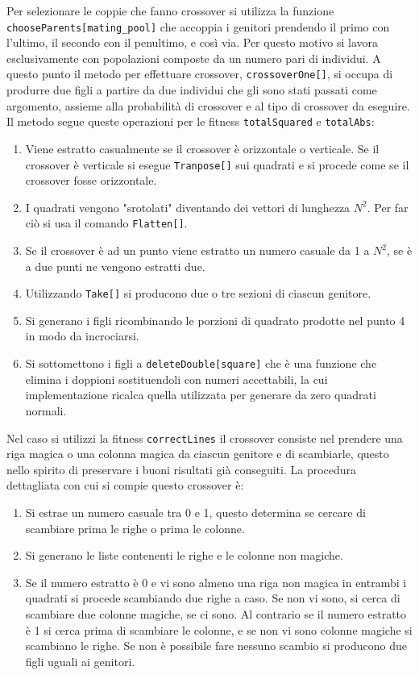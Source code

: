 \documentclass[italian,twoside,twocolumn]{article}
\begin{document}
Per selezionare le coppie che fanno crossover si utilizza la funzione \texttt{chooseParents[mating\_pool]} che accoppia i genitori prendendo il primo con l'ultimo, il secondo con il penultimo, e così via. Per questo motivo si lavora esclusivamente con popolazioni composte da un numero pari di individui. A questo punto il metodo per effettuare crossover, \texttt{crossoverOne[]}, si occupa di produrre due figli a partire da due individui che gli sono stati passati come argomento, assieme alla probabilità di crossover e al tipo di crossover da eseguire. Il metodo segue queste operazioni per le fitness \texttt{totalSquared} e \texttt{totalAbs}:
\begin{enumerate}
	\item Viene estratto casualmente se il crossover è orizzontale o verticale. Se il crossover è verticale si esegue \texttt{Tranpose[]} sui quadrati e si procede come se il crossover fosse orizzontale.
	\item I quadrati vengono "srotolati" diventando dei vettori di lunghezza $ N^2 $. Per far ciò si usa il comando \texttt{Flatten[]}.
	\item Se il crossover è ad un punto viene estratto un numero casuale da 1 a $ N^2 $, se è a due punti ne vengono estratti due.
	\item Utilizzando \texttt{Take[]} si producono due o tre sezioni di ciascun genitore.
	\item Si generano i figli ricombinando le porzioni di quadrato prodotte nel punto 4 in modo da incrociarsi.
	\item Si sottomettono i figli a \texttt{deleteDouble[square]} che è una funzione che elimina i doppioni sostituendoli con numeri accettabili, la cui implementazione ricalca quella utilizzata per generare da zero quadrati normali. 
\end{enumerate}
Nel caso si utilizzi la fitness \texttt{correctLines} il crossover consiste nel prendere una riga magica o una colonna magica da ciascun genitore e di scambiarle, questo nello spirito di preservare i buoni risultati già conseguiti. La procedura dettagliata con cui si compie questo crossover è:
\begin{enumerate}
	\item Si estrae un numero casuale tra 0 e 1, questo determina se cercare di scambiare prima le righe o prima le colonne.
	\item Si generano le liste contenenti le righe e le colonne non magiche.
	\item Se il numero estratto è 0 e vi sono almeno una riga non magica in entrambi i quadrati si procede scambiando due righe a caso. Se non vi sono, si cerca di scambiare due colonne magiche, se ci sono. Al contrario se il numero estratto è 1 si cerca prima di scambiare le colonne, e se non vi sono colonne magiche si scambiano le righe. Se non è possibile fare nessuno scambio si producono due figli uguali ai genitori.
\end{enumerate}
\end{document}
